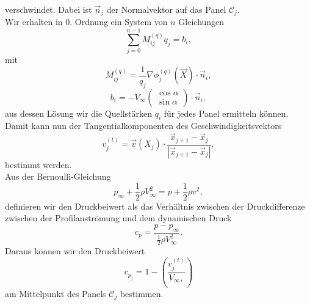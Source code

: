 verschwindet. Dabei ist $\vec n_j$ der Normalvektor auf das Panel $\mathcal{C}_j$.\\
Wir erhalten in 0. Ordnung ein System von $n$ Gleichungen
\begin{equation}
\label{eq:lgls1}
\sum_{j=0}^{n-1} M_{ij}^{(q)}q_j =  b_i,
\end{equation}
mit
\begin{equation}
M_{ij}^{(q)} = \frac{1}{q_j} \nabla \phi_j^{(q)} (\vec X) \cdot \vec n_i,
\end{equation}
\begin{equation}
b_i =  -V_{\infty} \left( \begin{matrix} \cos \alpha \\ \sin \alpha \end{matrix} \right) \cdot \vec n_i,
\end{equation}
aus dessen Lösung wir die Quellstärken $q_i$ für jedes Panel ermitteln können. \\
Damit kann nun der Tangentialkomponenten des Geschwindigkeitsvektors
\begin{equation}
\label{eqn:vt}
v_j^{(t)} =  \vec v(X_j) \cdot \frac{\vec x_{j+1}-\vec x_j}{|\vec x_{j+1}-\vec x_j|},
\end{equation}
bestimmt werden. \\
Aus der Bernoulli-Gleichung
\begin{equation}
p_{\infty} + \frac{1}{2} \rho V_{\infty}^2 =  p + \frac{1}{2} \rho v^2,
\end{equation}
definieren wir den Druckbeiwert als das Verhältnis zwischen der Druckdifferenze zwischen der Profilanströmung und dem dynamischen Druck 
\begin{equation}
c_p =  \frac{p-p_{\infty}}{\frac{1}{2} \rho V_{\infty}^2}.
\end{equation}
Daraus können wir den Druckbeiwert
\begin{equation}
c_{p_j} =  1 - \left( \frac{v_j^{(t)}}{V_{\infty},}\right)
\end{equation}
am Mittelpunkt des Panels $\mathcal{C}_j$ bestimmen.
